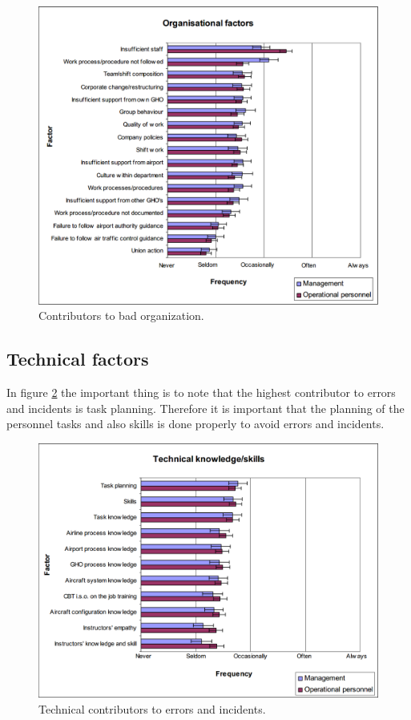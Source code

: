 \begin{figure}[H]
\centering
\includegraphics[width=\textwidth]{Grafik/OrganisationalFactors}
\caption{Contributors to bad organization.}
\label{OrganisationalFactors}
\end{figure}

\subsection{Technical factors}
In figure \ref{TechnicalFactors} the important thing is to note that the highest contributor to errors and incidents is task planning. Therefore it is important that the planning of the personnel tasks and also skills is done properly to avoid errors and incidents.

\begin{figure}[H]
\centering
\includegraphics[width=\textwidth]{Grafik/TechnicalFactors}
\caption{Technical contributors to errors and incidents.}
\label{TechnicalFactors}
\end{figure}

